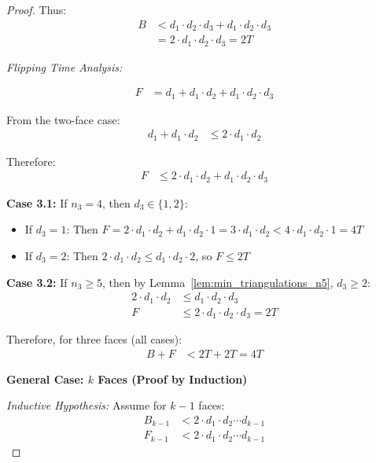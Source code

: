 \documentclass[12pt,a4paper]{article}
\theoremstyle{definition}
\theoremstyle{remark}
\begin{document}
\begin{proof}
Thus:
\begin{align}
B &< d_1 \cdot d_2 \cdot d_3 + d_1 \cdot d_2 \cdot d_3 \\
&= 2 \cdot d_1 \cdot d_2 \cdot d_3 = 2T
\end{align}

\textit{Flipping Time Analysis:}

\begin{align}
F &= d_1 + d_1 \cdot d_2 + d_1 \cdot d_2 \cdot d_3
\end{align}

From the two-face case:
\begin{align}
d_1 + d_1 \cdot d_2 &\leq 2 \cdot d_1 \cdot d_2
\end{align}

Therefore:
\begin{align}
F &\leq 2 \cdot d_1 \cdot d_2 + d_1 \cdot d_2 \cdot d_3
\end{align}

\textbf{Case 3.1:} If $n_3 = 4$, then $d_3 \in \{1, 2\}$:
\begin{itemize}
    \item If $d_3 = 1$: Then $F = 2 \cdot d_1 \cdot d_2 + d_1 \cdot d_2 \cdot 1 = 3 \cdot d_1 \cdot d_2 < 4 \cdot d_1 \cdot d_2 \cdot 1 = 4T$
    \item If $d_3 = 2$: Then $2 \cdot d_1 \cdot d_2 \leq d_1 \cdot d_2 \cdot 2$, so $F \leq 2T$
\end{itemize}

\textbf{Case 3.2:} If $n_3 \geq 5$, then by Lemma~\ref{lem:min_triangulations_n5}, $d_3 \geq 2$:
\begin{align}
2 \cdot d_1 \cdot d_2 &\leq d_1 \cdot d_2 \cdot d_3 \\
F &\leq 2 \cdot d_1 \cdot d_2 \cdot d_3 = 2T
\end{align}

Therefore, for three faces (all cases):
\begin{align}
B + F &< 2T + 2T = 4T
\end{align}

\vspace{0.3cm}
\noindent\textbf{General Case: $k$ Faces (Proof by Induction)}

\textit{Inductive Hypothesis:} Assume for $k - 1$ faces:
\begin{align}
B_{k-1} &< 2 \cdot d_1 \cdot d_2 \cdots d_{k-1} \\
F_{k-1} &< 2 \cdot d_1 \cdot d_2 \cdots d_{k-1}
\end{align}


\end{proof}
\end{document}
